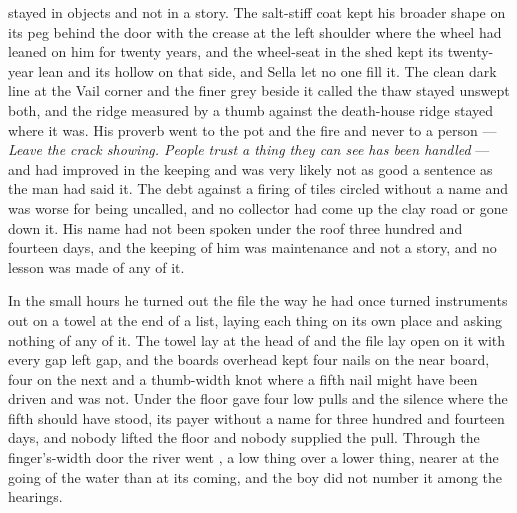  stayed in objects and not in a story. The salt-stiff coat kept his broader shape on its peg behind the door with the crease at the left shoulder where the wheel had leaned on him for twenty years, and the wheel-seat in the shed kept its twenty-year lean and its hollow on that side, and Sella let no one fill it. The clean dark line at the Vail corner and the finer grey beside it called the thaw stayed unswept both, and the ridge measured by a thumb against the death-house ridge stayed where it was. His proverb went to the pot and the fire and never to a person --- \emph{Leave the crack showing. People trust a thing they can see has been handled} --- and had improved in the keeping and was very likely not as good a sentence as the man had said it. The debt against a firing of tiles circled without a name and was worse for being uncalled, and no collector had come up the clay road or gone down it. His name had not been spoken under the roof three hundred and fourteen days, and the keeping of him was maintenance and not a story, and no lesson was made of any of it.

\scenebreak

In the small hours he turned out the file the way he had once turned instruments out on a towel at the end of a list, laying each thing on its own place and asking nothing of any of it. The towel lay at the head of  and the file lay open on it with every gap left gap, and the boards overhead kept four nails on the near board, four on the next and a thumb-width knot where a fifth nail might have been driven and was not. Under the floor  gave four low pulls and the silence where the fifth should have stood, its payer without a name for three hundred and fourteen days, and nobody lifted the floor and nobody supplied the pull. Through the finger's-width door the river went , a low thing over a lower thing, nearer at the going of the water than at its coming, and the boy did not number it among the hearings.

